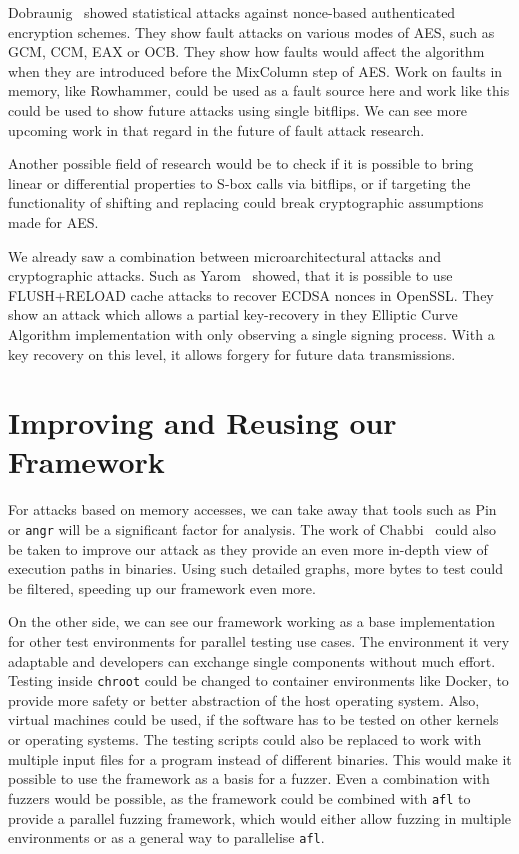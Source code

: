 Dobraunig~\etal\cite{noncestat} showed statistical attacks against nonce-based
authenticated encryption schemes. They show fault attacks on various modes of
AES, such as GCM, CCM, EAX or OCB. They show how faults would affect the
algorithm when they are introduced before the MixColumn step of AES. Work on
faults in memory, like Rowhammer, could be used as a fault source here and work
like this could be used to show future attacks using single bitflips. We can see
more upcoming work in that regard in the future of fault attack research.

Another possible field of research would be to check if it is possible to bring
linear or differential properties to S-box calls via bitflips, or if targeting
the functionality of shifting and replacing could break cryptographic
assumptions made for AES.

We already saw a combination between microarchitectural attacks and
cryptographic attacks. Such as Yarom~\etal\cite{noncerec} showed, that it is
possible to use FLUSH+RELOAD cache attacks to recover ECDSA nonces in OpenSSL.
They show an attack which allows a partial key-recovery in they Elliptic Curve
Algorithm implementation with only observing a single signing process. With a
key recovery on this level, it allows forgery for future data transmissions.

\section{Improving and Reusing our Framework}

For attacks based on memory accesses, we can take away that tools such as
Pin\cite{pintool} or \texttt{angr}\cite{angrpaper} will be a significant
factor for analysis. The work of Chabbi~\etal\cite{pincallpaths} could also be
taken to improve our attack as they provide an even more in-depth view of
execution paths in binaries. Using such detailed graphs, more bytes to test
could be filtered, speeding up our framework even more.

On the other side, we can see our framework working as a base implementation for
other test environments for parallel testing use cases. The environment it very
adaptable and developers can exchange single components without much effort.
Testing inside \texttt{chroot} could be changed to container environments like
Docker\cite{docker}, to provide more safety or better abstraction of the host
operating system. Also, virtual machines could be used, if the software has to
be tested on other kernels or operating systems. The testing scripts could also
be replaced to work with multiple input files for a program instead of different
binaries. This would make it possible to use the framework as a basis for a
fuzzer. Even a combination with fuzzers would be possible, as the framework
could be combined with \texttt{afl}\cite{aflweb} to provide a parallel fuzzing
framework, which would either allow fuzzing in multiple environments or as a
general way to parallelise \texttt{afl}.

